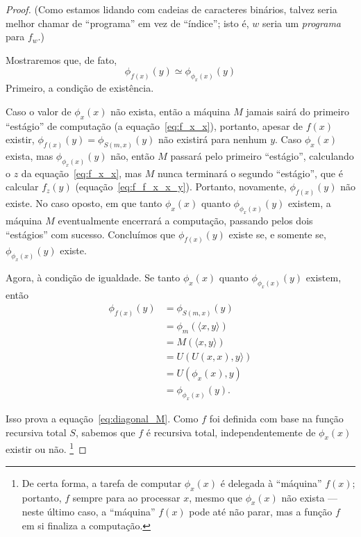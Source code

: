\begin{proof}
{        (Como estamos lidando com cadeias de caracteres binários,
        talvez seria melhor chamar de ``programa'' em vez de ``índice'';
        isto é, $w$ seria um \emph{programa} para $f_w$.)
    }

    Mostraremos que,
    de fato,
    \begin{equation*}
        \phi_{f(x)}(y) \simeq \phi_{\phi_x(x)}(y)
    \end{equation*}
    Primeiro, a condição de existência.

    Caso o valor de $\phi_x(x)$ não exista,
    então a máquina $M$ jamais sairá do primeiro ``estágio'' de computação
    (a equação~\ref{eq:f_x_x}),
    portanto,
    apesar de $f(x)$ existir,
    $\phi_{f(x)}(y) = \phi_{S(m, x)}(y)$
    não existirá para nenhum $y$.
    Caso $\phi_x(x)$ exista,
    mas $\phi_{\phi_x(x)}(y)$ não,
    então $M$ passará pelo primeiro ``estágio'',
    calculando o $z$ da equação~\ref{eq:f_x_x},
    mas $M$ nunca terminará o segundo ``estágio'',
    que é calcular $f_z(y)$ (equação~\ref{eq:f_f_x_x_y}).
    Portanto, novamente,
    $\phi_{f(x)}(y)$ não existe.
    No caso oposto,
    em que tanto $\phi_x(x)$ quanto $\phi_{\phi_x(x)}(y)$ existem,
    a máquina $M$ eventualmente encerrará a computação,
    passando pelos dois ``estágios'' com sucesso.
    Concluímos que $\phi_{f(x)}(y)$ existe se,
    e somente se, $\phi_{\phi_x(x)}(y)$ existe.

    Agora, à condição de igualdade.
    Se tanto $\phi_x(x)$ quanto $\phi_{\phi_x(x)}(y)$ existem, então
    \begin{align*}
        \phi_{f(x)}(y) &= \phi_{S(m, x)}(y) \\
                       &= \phi_m( \langle x, y \rangle ) \\
                       &= M( \langle x, y \rangle ) \\
                       &= U( U(x, x), y \rangle ) \\
                       &= U( \phi_x(x), y ) \\
                       &= \phi_{\phi_x(x)}(y).
    \end{align*}

    Isso prova a equação~\ref{eq:diagonal_M}.
    Como $f$ foi definida com base na função recursiva total $S$,
    sabemos que $f$ é recursiva total,
    independentemente de $\phi_x(x)$ existir ou não.
    \footnote{
        De certa forma,
        a tarefa de computar $\phi_x(x)$ é delegada à ``máquina'' $f(x)$;
        portanto, $f$ sempre para ao processar $x$,
        mesmo que $\phi_x(x)$ não exista
        --- neste último caso, a ``máquina'' $f(x)$ pode até não parar,
        mas a função $f$ em si finaliza a computação.
    }


\end{proof}
